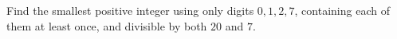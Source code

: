 Find the smallest positive integer using only digits $0,1,2,7$, containing each of them at least once, and divisible by both $20$ and $7$.
